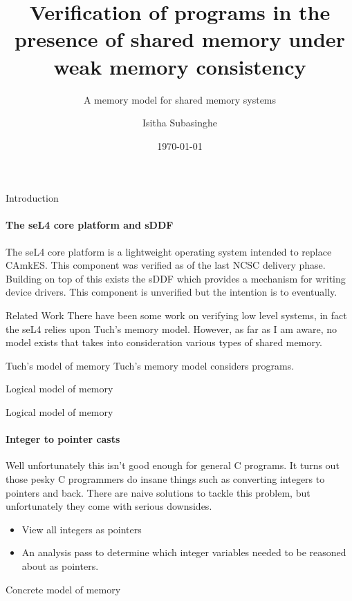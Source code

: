 \documentclass[aspectratio=169]{beamer}
\author{Isitha Subasinghe}
\title{Verification of programs in the presence of shared memory under weak memory consistency}
\subtitle{A memory model for shared memory systems}
\institute{School of Computer Science and Engineering}
\date{\today}
\begin{document}
	\begin{frame}[plain]
		\titlepage
	\end{frame}
	
	\begin{frame}{Introduction}
    \framesubtitle{The seL4 core platform and sDDF}  
    The seL4 core platform is a lightweight operating system intended to replace CAmkES. 
    This component was verified as of the last NCSC delivery phase. Building on top of this exists 
    the sDDF which provides a mechanism for writing device drivers. This component is unverified but the intention is to eventually. 
	\end{frame}

  \begin{frame}{Related Work}
    There have been some work on verifying low level systems, in fact the seL4 relies upon Tuch's memory model. 
    However, as far as I am aware, no model exists that takes into consideration various types of shared memory. 
  \end{frame}

  \begin{frame}{Tuch's model of memory}
    Tuch's \cite{tuch2007types} memory model considers programs.  
  \end{frame}

  \begin{frame}{Logical model of memory}
  \end{frame}
  
  \begin{frame}{Logical model of memory}
    \framesubtitle{Integer to pointer casts}
    Well unfortunately this isn't good enough for general C programs. It turns out those pesky C programmers do insane things such as 
    converting integers to pointers and back. There are naive solutions to tackle this problem, but unfortunately they come with serious downsides. 
    \begin{itemize}
      \item View all integers as pointers
      \item An analysis pass to determine which integer variables needed to be reasoned about as pointers. 
    \end{itemize}
  \end{frame}

  \begin{frame}{Concrete model of memory}
  \end{frame}
\end{document}
